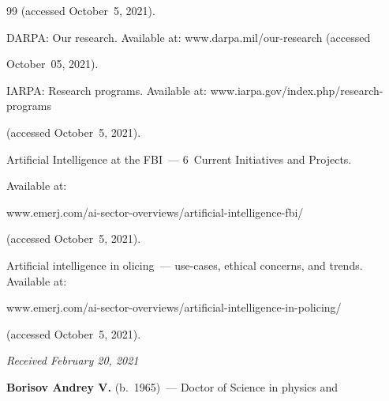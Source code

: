 {{\begin{thebibliography}{99}
      (accessed October~5, 2021).




DARPA: Our research. Available at: {\sf www.darpa.mil/our-research} (accessed


October~05, 2021).




IARPA: Research programs. Available at: {\sf www.iarpa.gov/index.php/research-programs} 


(accessed October~5, 2021).




Artificial Intelligence at the FBI~--- 6~Current Initiatives and Projects.


 Available at:


     {\sf www.emerj.com/ai-sector-overviews/artificial-intelligence-fbi/}


(accessed October~5, 2021).




Artificial intelligence in olicing~--- use-cases, ethical concerns, and trends. Available at:


{\sf www.emerj.com/ai-sector-overviews/artificial-intelligence-in-policing/}


(accessed October~5, 2021).


\end{thebibliography}


} }





\vspace*{-9pt}





\hfill{\small\textit{Received February 20, 2021}}





\vspace*{-16pt}





\Contr





\vspace*{-8pt}





\noindent


\textbf{Borisov Andrey V.} (b.\ 1965)~--- Doctor of Science in physics and


